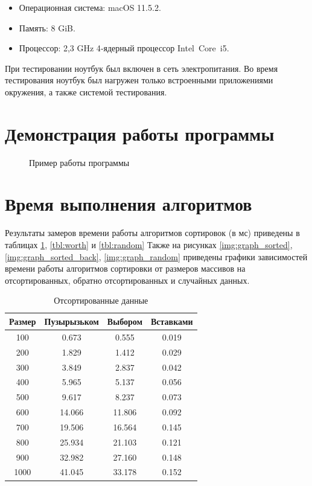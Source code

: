 \documentclass[a4paper,14pt, unknownkeysallowed]{extreport}
\newcommand{\img}[3] {
	\begin{figure}[h!]
		\center{\texttt{[image: img/\#2]}}
		\caption{#3}
		\label{img:#2}
	\end{figure}
}
\begin{document}
\begin{itemize}
    \item Операционная система: macOS 11.5.2.
    \item Память: 8 GiB.
    \item Процессор: 2,3 GHz 4‑ядерный процессор Intel Core i5.
\end{itemize}

При тестировании ноутбук был включен в сеть электропитания. Во время тестирования ноутбук был нагружен только встроенными приложениями окружения, а также системой тестирования.

\section{Демонстрация работы программы}

\img{180mm}{example}{Пример работы программы}
\clearpage

\section{Время выполнения алгоритмов}


Результаты замеров времени работы алгоритмов сортировок (в мс) приведены в таблицах \ref{tbl:best}, \ref{tbl:worth} и \ref{tbl:random} Также на рисунках \ref{img:graph_sorted}, \ref{img:graph_sorted_back}, \ref{img:graph_random} приведены графики зависимостей времени работы алгоритмов сортировки от размеров массивов на отсортированных, обратно отсортированных и случайных данных.


\begin{table}[h]
	\begin{center}
		\begin{threeparttable}
		\captionsetup{justification=raggedleft,singlelinecheck=off}
		\caption{Отсортированные данные}
		\label{tbl:best}
		\begin{tabular}{|c|c|c|c|}
			\hline
			Размер & Пузырызьком & Выбором & Вставками \\
			\hline
			100    & 0.673  & 0.555  & 0.019 \\ 
			\hline
			200    & 1.829  & 1.412  & 0.029 \\ 
			\hline
			300    & 3.849  & 2.837  & 0.042 \\ 
			\hline
			400    & 5.965  & 5.137  & 0.056 \\ 
			\hline
			500    & 9.617  & 8.237  & 0.073 \\ 
			\hline
			600    & 14.066 & 11.806 & 0.092 \\ 
			\hline
			700    & 19.506 & 16.564 & 0.145 \\ 
			\hline
			800    & 25.934 & 21.103 & 0.121 \\ 
			\hline
			900    & 32.982 & 27.160 & 0.148 \\ 
			\hline
			1000   & 41.045 & 33.178 & 0.152 \\ 
			\hline
		\end{tabular}
		\end{threeparttable}
    \end{center}
\end{table}
\end{document}
